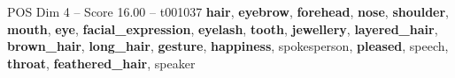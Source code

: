 \begin{textsample}{POS Dim 4 – Score 16.00 – t001037}  \label{ex:f4_pos_039}
\textbf{hair}, \textbf{eyebrow}, \textbf{forehead}, \textbf{nose}, \textbf{shoulder}, \textbf{mouth}, \textbf{eye}, \textbf{facial\_expression}, \textbf{eyelash}, \textbf{tooth}, \textbf{jewellery}, \textbf{layered\_hair}, \textbf{brown\_hair}, \textbf{long\_hair}, \textbf{gesture}, \textbf{happiness}, spokesperson, \textbf{pleased}, speech, \textbf{throat}, \textbf{feathered\_hair}, speaker

\end{textsample}
